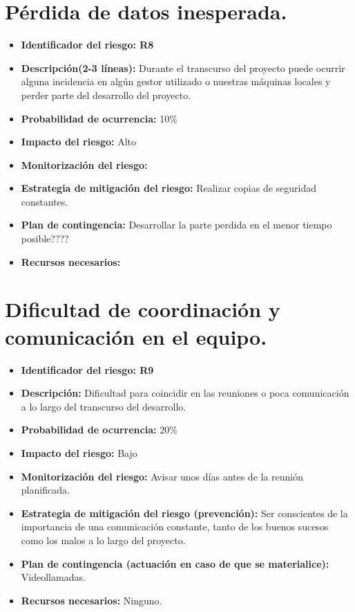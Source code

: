 \documentclass[a4paper,12pt,oneside]{article}
\begin{document}
\section*{Pérdida de datos inesperada.}
\begin{itemize}
	\item \textbf{Identificador del riesgo: R8}
	\item \textbf{Descripción(2-3 líneas): } Durante el transcurso del proyecto puede ocurrir alguna incidencia en algún gestor utilizado o nuestras máquinas locales y perder parte del desarrollo del proyecto.
	\item \textbf{Probabilidad de ocurrencia: } 10\%
	\item \textbf{Impacto del riesgo: } Alto
	\item \textbf{Monitorización del riesgo: } 
	\item \textbf{Estrategia de mitigación del riesgo: } Realizar copias de seguridad constantes.
	\item \textbf{Plan de contingencia: } Desarrollar la parte perdida en el menor tiempo posible????
	\item \textbf{Recursos necesarios: }
\end{itemize}

\section*{Dificultad de coordinación y comunicación en el equipo.}
\begin{itemize}
	\item \textbf{Identificador del riesgo: R9}
	\item \textbf{Descripción: } Dificultad para coincidir en las reuniones  o poca comunicación a lo largo del transcurso del desarrollo.
	\item \textbf{Probabilidad de ocurrencia: } 20\%
	\item \textbf{Impacto del riesgo: } Bajo
	\item \textbf{Monitorización del riesgo: } Avisar unos días antes de la reunión planificada.
	\item \textbf{Estrategia de mitigación del riesgo (prevención): } Ser conscientes de la importancia de una comunicación constante, tanto de los buenos sucesos como los malos a lo largo del proyecto.
	\item \textbf{Plan de contingencia (actuación en caso de que se materialice): } Videollamadas.
	\item \textbf{Recursos necesarios: } Ninguno.
\end{itemize}
\end{document}
